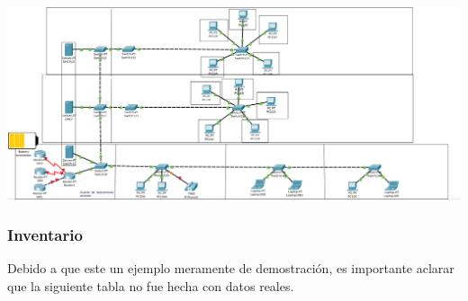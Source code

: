 \documentclass[spanish,12pt,letterpaper]{article}
\begin{document}
\begin{center}
  \includegraphics[scale=.28]{nuevoP.png}
\end{center}

\subsubsection{Inventario}
Debido a que este un ejemplo meramente de demostración, es importante aclarar que
la siguiente tabla no fue hecha con datos reales.
\end{document}
